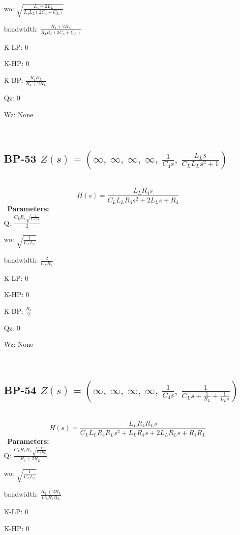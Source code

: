 \documentclass{article}
\begin{document}
wo: $\sqrt{\frac{L_{4} + 2 L_{L}}{L_{4} L_{L} \left(2 C_{4} + C_{L}\right)}}$\ 

bandwidth: $\frac{R_{4} + 2 R_{L}}{R_{4} R_{L} \left(2 C_{4} + C_{L}\right)}$\ 

K-LP: $0$\ 

K-HP: $0$\ 

K-BP: $\frac{R_{4} R_{L}}{R_{4} + 2 R_{L}}$\ 

Qz: $0$\ 

Wz: $\text{None}$\ 

\ 

\subsection{BP-53 $Z(s) = \left( \infty, \  \infty, \  \infty, \  \infty, \  \frac{1}{C_{4} s}, \  \frac{L_{L} s}{C_{L} L_{L} s^{2} + 1}\right)$ } \ 
\textbf{\[H(s) = \frac{L_{L} R_{4} s}{C_{L} L_{L} R_{4} s^{2} + 2 L_{L} s + R_{4}}\] } \ 
\textbf{Parameters:}\\ 

Q: $\frac{C_{L} R_{4} \sqrt{\frac{1}{C_{L} L_{L}}}}{2}$\ 

wo: $\sqrt{\frac{1}{C_{L} L_{L}}}$\ 

bandwidth: $\frac{2}{C_{L} R_{4}}$\ 

K-LP: $0$\ 

K-HP: $0$\ 

K-BP: $\frac{R_{4}}{2}$\ 

Qz: $0$\ 

Wz: $\text{None}$\ 

\ 

\subsection{BP-54 $Z(s) = \left( \infty, \  \infty, \  \infty, \  \infty, \  \frac{1}{C_{4} s}, \  \frac{1}{C_{L} s + \frac{1}{R_{L}} + \frac{1}{L_{L} s}}\right)$ } \ 
\textbf{\[H(s) = \frac{L_{L} R_{4} R_{L} s}{C_{L} L_{L} R_{4} R_{L} s^{2} + L_{L} R_{4} s + 2 L_{L} R_{L} s + R_{4} R_{L}}\] } \ 
\textbf{Parameters:}\\ 

Q: $\frac{C_{L} R_{4} R_{L} \sqrt{\frac{1}{C_{L} L_{L}}}}{R_{4} + 2 R_{L}}$\ 

wo: $\sqrt{\frac{1}{C_{L} L_{L}}}$\ 

bandwidth: $\frac{R_{4} + 2 R_{L}}{C_{L} R_{4} R_{L}}$\ 

K-LP: $0$\ 

K-HP: $0$\ 
\end{document}
